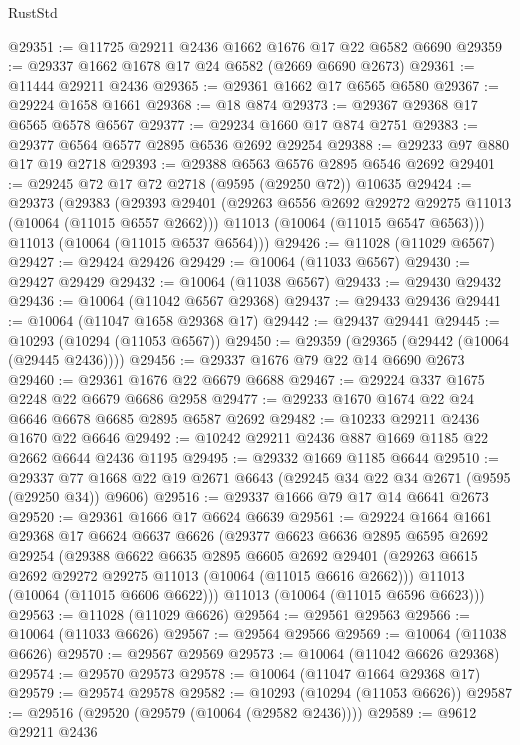 \begin{lexlean}{RustStd}
\begin{coremodule}
@29351 := @11725 @29211 @2436 @1662 @1676 @17 @22 @6582 @6690
@29359 := @29337 @1662 @1678 @17 @24 @6582 (@2669 @6690 @2673)
@29361 := @11444 @29211 @2436
@29365 := @29361 @1662 @17 @6565 @6580
@29367 := @29224 @1658 @1661
@29368 := @18 @874
@29373 := @29367 @29368 @17 @6565 @6578 @6567
@29377 := @29234 @1660 @17 @874 @2751
@29383 := @29377 @6564 @6577 @2895 @6536 @2692 @29254
@29388 := @29233 @97 @880 @17 @19 @2718
@29393 := @29388 @6563 @6576 @2895 @6546 @2692
@29401 := @29245 @72 @17 @72 @2718 (@9595 (@29250 @72)) @10635
@29424 := @29373
    (@29383
      (@29393
        @29401
        (@29263 @6556 @2692 @29272 @29275 @11013 (@10064 (@11015 @6557 @2662)))
        @11013
        (@10064 (@11015 @6547 @6563)))
      @11013
      (@10064 (@11015 @6537 @6564)))
@29426 := @11028 (@11029 @6567)
@29427 := @29424 @29426
@29429 := @10064 (@11033 @6567)
@29430 := @29427 @29429
@29432 := @10064 (@11038 @6567)
@29433 := @29430 @29432
@29436 := @10064 (@11042 @6567 @29368)
@29437 := @29433 @29436
@29441 := @10064 (@11047 @1658 @29368 @17)
@29442 := @29437 @29441
@29445 := @10293 (@10294 (@11053 @6567))
@29450 := @29359 (@29365 (@29442 (@10064 (@29445 @2436))))
@29456 := @29337 @1676 @79 @22 @14 @6690 @2673
@29460 := @29361 @1676 @22 @6679 @6688
@29467 := @29224 @337 @1675 @2248 @22 @6679 @6686 @2958
@29477 := @29233 @1670 @1674 @22 @24 @6646 @6678 @6685 @2895 @6587 @2692
@29482 := @10233 @29211 @2436 @1670 @22 @6646
@29492 := @10242 @29211 @2436 @887 @1669 @1185 @22 @2662 @6644 @2436 @1195
@29495 := @29332 @1669 @1185 @6644
@29510 := @29337 @77 @1668 @22 @19 @2671 @6643 (@29245 @34 @22 @34 @2671 (@9595 (@29250 @34)) @9606)
@29516 := @29337 @1666 @79 @17 @14 @6641 @2673
@29520 := @29361 @1666 @17 @6624 @6639
@29561 := @29224
    @1664
    @1661
    @29368
    @17
    @6624
    @6637
    @6626
    (@29377
      @6623
      @6636
      @2895
      @6595
      @2692
      @29254
      (@29388
        @6622
        @6635
        @2895
        @6605
        @2692
        @29401
        (@29263 @6615 @2692 @29272 @29275 @11013 (@10064 (@11015 @6616 @2662)))
        @11013
        (@10064 (@11015 @6606 @6622)))
      @11013
      (@10064 (@11015 @6596 @6623)))
@29563 := @11028 (@11029 @6626)
@29564 := @29561 @29563
@29566 := @10064 (@11033 @6626)
@29567 := @29564 @29566
@29569 := @10064 (@11038 @6626)
@29570 := @29567 @29569
@29573 := @10064 (@11042 @6626 @29368)
@29574 := @29570 @29573
@29578 := @10064 (@11047 @1664 @29368 @17)
@29579 := @29574 @29578
@29582 := @10293 (@10294 (@11053 @6626))
@29587 := @29516 (@29520 (@29579 (@10064 (@29582 @2436))))
@29589 := @9612 @29211 @2436

\end{coremodule}
\end{lexlean}
